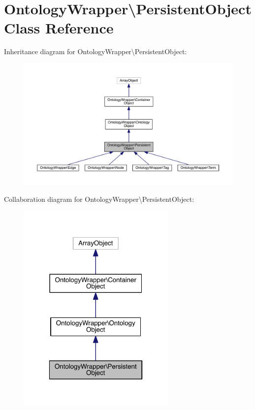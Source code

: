 \hypertarget{class_ontology_wrapper_1_1_persistent_object}{\section{Ontology\-Wrapper\textbackslash{}Persistent\-Object Class Reference}
\label{class_ontology_wrapper_1_1_persistent_object}
}


Inheritance diagram for Ontology\-Wrapper\textbackslash{}Persistent\-Object\-:
\nopagebreak
\begin{figure}[H]
\begin{center}
\leavevmode
\includegraphics[width=350pt]{class_ontology_wrapper_1_1_persistent_object__inherit__graph}
\end{center}
\end{figure}


Collaboration diagram for Ontology\-Wrapper\textbackslash{}Persistent\-Object\-:
\nopagebreak
\begin{figure}[H]
\begin{center}
\leavevmode
\includegraphics[width=220pt]{class_ontology_wrapper_1_1_persistent_object__coll__graph}
\end{center}
\end{figure}
